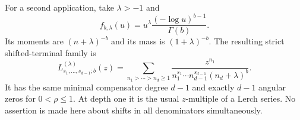 For a second application, take $\lambda>-1$ and
\[
 f_{b,\lambda}(u)=u^\lambda
                \frac{(-\log u)^{b-1}}{\Gamma(b)}.
\]
Its moments are $(n+\lambda)^{-b}$ and its mass is
$(1+\lambda)^{-b}$. The resulting strict shifted-terminal family is
\begin{equation}\label{ado:eq:lerchfamily}
 L^{(\lambda)}_{s_1,\ldots,s_{d-1};b}(z)
 =\sum_{n_1>\cdots>n_d\ge1}
 \frac{z^{n_1}}{n_1^{s_1}\cdots n_{d-1}^{s_{d-1}}(n_d+\lambda)^b}.
\end{equation}
It has the same minimal compensator degree $d-1$ and exactly $d-1$
angular zeros for $0<\rho\le1$. At depth one it is the usual
$z$-multiple of a Lerch series. No assertion is made here about shifts
in all denominators simultaneously.
